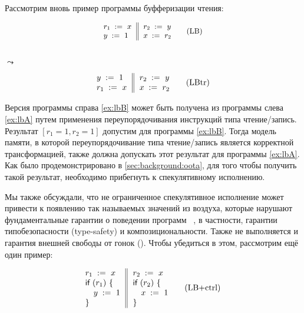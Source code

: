 Рассмотрим вновь пример программы буфферизации чтения:

\begin{minipage}{0.43\linewidth}
\begin{equation*}
\small
\inarrII{
  \readInst{}{r_1}{x}     \\
  \writeInst{}{y}{1}      \\
}{
  \readInst{}{r_2}{y}     \\
  \writeInst{}{x}{r_2}    \\
}
\tag{LB}\label{ex:lbA}
\end{equation*}
\end{minipage}\hfill%
\begin{minipage}{0.09\linewidth}
\Large~\\ $\leadsto$
\end{minipage}\hfill%
\begin{minipage}{0.43\linewidth}
\begin{equation*}
\inarrII{
  \writeInst{}{y}{1}      \\
  \readInst{}{r_1}{x}     \\
}{
  \readInst{}{r_2}{y}     \\
  \writeInst{}{x}{r_2}    \\
}
\tag{LBtr}\label{ex:lbB}
\end{equation*}
\end{minipage}

Версия программы справа \ref{ex:lbB} может быть 
получена из программы слева \ref{ex:lbA} 
путем применения переупорядочивания инструкций типа чтение/запись. 
Результат ${[r_1=1, r_2=1]}$ допустим для программы \ref{ex:lbB}.
Тогда модель памяти, в которой переупорядочивание типа чтение/запись
является корректной трансформацией, также должна 
допускать этот результат для программы \ref{ex:lbA}.
Как было продемонстрировано в \cref{sec:background:oota}, 
для того чтобы получить такой результат, 
необходимо прибегнуть к спекулятивному исполнению. 

Мы также обсуждали, что не ограниченное 
спекулятивное исполнение может привести к появлению 
так называемых значений из воздуха, 
которые нарушают фундаментальные гарантии 
о поведении программ~%
\cite{Boehm-Demsky:MSPC14, Batty-al:ESOP15}, 
в частности, гарантии типобезопасности (type-safety)
и композициональности.  
Также не выполняется и гарантия внешней свободы от гонок (\eDRF).
Чтобы убедиться в этом, рассмотрим ещё один пример:

\begin{equation*}
\inarrII{
  \readInst{}{r_1}{x}      \\
  \kw{if} {(r_1)} ~\{      \\
  \quad\writeInst{}{y}{1}  \\
  \}
}{
  \readInst{}{r_2}{x}      \\
  \kw{if} {(r_2)} ~\{      \\
  \quad\writeInst{}{x}{1}  \\
  \}
}
\tag{LB+ctrl}\label{ex:lb+ctrl}
\end{equation*}

